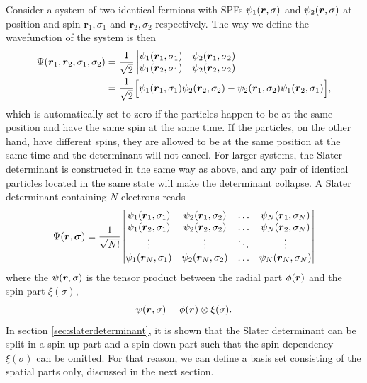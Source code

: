 Consider a system of two identical fermions with SPFs $\psi_1(\boldsymbol{{r}},\sigma)$ and $\psi_2(\boldsymbol{{r}},\sigma)$ at position and spin $\boldsymbol{r}_1,\sigma_1$ and $\boldsymbol{r}_2,\sigma_2$ respectively. The way we define the wavefunction of the system is then
\begin{equation}
\begin{aligned}
\Psi(\boldsymbol{{r}}_1,\boldsymbol{{r}}_2, \sigma_1,\sigma_2)&=\frac{1}{\sqrt{2}}
\begin{vmatrix}
\psi_1(\boldsymbol{r}_1,\sigma_1) & \psi_2(\boldsymbol{r}_1,\sigma_2)\\
\psi_1(\boldsymbol{r}_2,\sigma_1) & \psi_2(\boldsymbol{r}_2,\sigma_2)
\end{vmatrix}\\
&=\frac{1}{\sqrt{2}}\Big[\psi_1(\boldsymbol{r}_1,\sigma_1)\psi_2(\boldsymbol{r}_2,\sigma_2)-\psi_2(\boldsymbol{r}_1,\sigma_2)\psi_1(\boldsymbol{r}_2,\sigma_1)\Big],
\end{aligned}
\end{equation}
which is automatically set to zero if the particles happen to be at the same position and have the same spin at the same time. If the particles, on the other hand, have different spins, they are allowed to be at the same position at the same time and the determinant will not cancel. For larger systems, the Slater determinant is constructed in the same way as above, and any pair of identical particles located in the same state will make the determinant collapse. A Slater determinant containing $N$ electrons reads
\begin{equation}
\Psi(\boldsymbol{{r}},\boldsymbol{{\sigma}})=\frac{1}{\sqrt{N!}}
\begin{vmatrix}
\psi_1(\boldsymbol{r}_1,\sigma_1) & \psi_2(\boldsymbol{r}_1,\sigma_2) & \hdots & \psi_N(\boldsymbol{r}_1,\sigma_N)\\
\psi_1(\boldsymbol{r}_2,\sigma_1) & \psi_2(\boldsymbol{r}_2,\sigma_2) & \hdots & \psi_N(\boldsymbol{r}_2,\sigma_N)\\
\vdots & \vdots & \ddots & \vdots \\
\psi_1(\boldsymbol{r}_N,\sigma_1) & \psi_2(\boldsymbol{r}_N,\sigma_2) & \hdots & \psi_N(\boldsymbol{r}_N,\sigma_N)
\end{vmatrix}
\end{equation}
where the $\psi(\boldsymbol{{r}},\sigma)$ is the tensor product between the radial part $\phi(\boldsymbol{{r}})$ and the spin part $\xi(\sigma)$,
\begin{equation}
\psi(\boldsymbol{{r}},\sigma)=\phi(\boldsymbol{{r}})\otimes\xi(\sigma).
\end{equation}
In section \ref{sec:slaterdeterminant}, it is shown that the Slater determinant can be split in a spin-up part and a spin-down part such that the spin-dependency $\xi(\sigma)$ can be omitted. For that reason, we can define a basis set consisting of the spatial parts only, discussed in the next section. 

